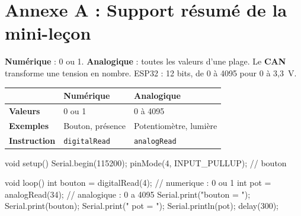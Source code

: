\documentclass[11pt,a4paper]{article}
\begin{document}


\newpage
\section*{Annexe A : Support résumé de la mini-leçon}

\begin{tcolorbox}[colback=yellow!10,colframe=yellow!50!black]
\textbf{Numérique} : 0 ou 1. \textbf{Analogique} : toutes les valeurs d'une plage. Le \textbf{CAN} transforme une tension en nombre. ESP32 : 12 bits, de 0 à 4095 pour 0 à 3,3~V.
\end{tcolorbox}

\begin{tabularx}{\linewidth}{>{\bfseries}p{3.4cm}Y Y}
\toprule
 & Numérique & Analogique\\
\midrule
Valeurs & 0 ou 1 & 0 à 4095\\
Exemples & Bouton, présence & Potentiomètre, lumière\\
Instruction & \texttt{digitalRead} & \texttt{analogRead}\\
\bottomrule
\end{tabularx}

\begin{arduino}
void setup() {
  Serial.begin(115200);
  pinMode(4, INPUT_PULLUP);       // bouton
}

void loop() {
  int bouton = digitalRead(4);    // numerique : 0 ou 1
  int pot = analogRead(34);       // analogique : 0 a 4095
  Serial.print("bouton = ");
  Serial.print(bouton);
  Serial.print("   pot = ");
  Serial.println(pot);
  delay(300);
}
\end{arduino}
\end{document}
